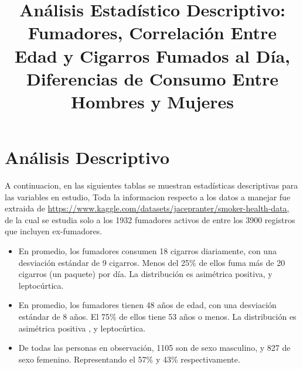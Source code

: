 \documentclass[
  stu,
  longtable,
  nolmodern,
  notxfonts,
  notimes,
  colorlinks=true,linkcolor=blue,citecolor=blue,urlcolor=blue]{apa7}
\title{Análisis Estadístico Descriptivo: Fumadores, Correlación Entre
Edad y Cigarros Fumados al Día, Diferencias de Consumo Entre Hombres y
Mujeres}
\begin{document}
\maketitle


\setcounter{secnumdepth}{-\maxdimen} %

\setlength\LTleft{0pt}


\section{Análisis Descriptivo}\label{anuxe1lisis-descriptivo}

A continuacion, en las siguientes tablas se muestran estadísticas
descriptivas para las variables en estudio, Toda la informacion respecto
a los datos a manejar fue extraida de
\url{https://www.kaggle.com/datasets/jacepranter/smoker-health-data,} de
la cual se estudia solo a los 1932 fumadores activos de entre los 3900
registros que incluyen ex-fumadores.

\begin{itemize}
\item
  En promedio, los fumadores consumen 18 cigarros diariamente, con una
  desviación estándar de 9 cigarros. Menos del 25\% de ellos fuma más de
  20 cigarros (un paquete) por día. La distribución es asimétrica
  positiva, y leptocúrtica.
\item
  En promedio, los fumadores tienen 48 años de edad, con una desviación
  estándar de 8 años. El 75\% de ellos tiene 53 años o menos. La
  distribución es asimétrica positiva , y leptocúrtica.
\item
  De todas las personas en observación, 1105 son de sexo masculino, y
  827 de sexo femenino. Representando el 57\% y 43\% respectivamente.
\end{itemize}
\end{document}
